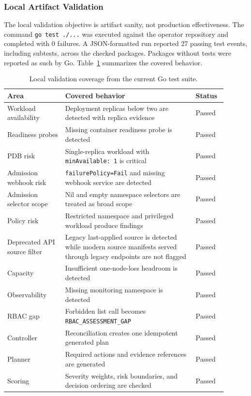 \documentclass[10pt,journal]{IEEEtran}
\newcommand{\code}[1]{\texttt{#1}}
\begin{document}
\subsubsection*{Local Artifact Validation}
\label{sec:local-validation}
The local validation objective is artifact sanity, not production effectiveness. The command \code{go test ./...} was executed against the operator repository and completed with 0 failures. A JSON-formatted run reported 27 passing test events, including subtests, across the checked packages. Packages without tests were reported as such by Go. Table~\ref{tab:tests} summarizes the covered behavior.

\begin{table}[t]
  \centering
  \caption{Local validation coverage from the current Go test suite.}
  \label{tab:tests}
  \begin{tabular}{p{0.24\linewidth}p{0.54\linewidth}p{0.12\linewidth}}
    \toprule
    Area & Covered behavior & Status \\
    \midrule
    Workload availability & Deployment replicas below two are detected with replica evidence & Passed \\
    Readiness probes & Missing container readiness probe is detected & Passed \\
    PDB risk & Single-replica workload with \code{minAvailable: 1} is critical & Passed \\
    Admission webhook risk & \code{failurePolicy=Fail} and missing webhook service are detected & Passed \\
    Admission selector scope & Nil and empty namespace selectors are treated as broad scope & Passed \\
    Policy risk & Restricted namespace and privileged workload produce findings & Passed \\
    Deprecated API source filter & Legacy last-applied source is detected while modern source manifests served through legacy endpoints are not flagged & Passed \\
    Capacity & Insufficient one-node-loss headroom is detected & Passed \\
    Observability & Missing monitoring namespace is detected & Passed \\
    RBAC gap & Forbidden list call becomes \code{RBAC\_ASSESSMENT\_GAP} & Passed \\
    Controller & Reconciliation creates one idempotent generated plan & Passed \\
    Planner & Required actions and evidence references are generated & Passed \\
    Scoring & Severity weights, risk boundaries, and decision ordering are checked & Passed \\
    \bottomrule
  \end{tabular}
\end{table}
\end{document}
